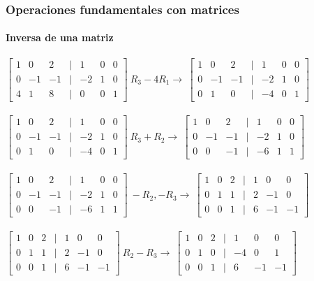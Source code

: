 \documentclass[11pt]{beamer}
\begin{document}
\begin{frame}
\frametitle{Operaciones fundamentales con matrices}
\framesubtitle{Inversa de una matriz}
${\displaystyle {\begin{bmatrix}1&0&2&|&1&0&0\\0&-1&-1&|&-2&1&0\\4&1&8&|&0&0&1\end{bmatrix}}} 
~ R_3 -4R_1 \rightarrow ~ {\displaystyle {\begin{bmatrix}1&0&2&|&1&0&0\\0&-1&-1&|&-2&1&0\\0&1&0&|&-4&0&1\end{bmatrix}}}$\\ \hspace{0cm} \\
${\displaystyle {\begin{bmatrix}1&0&2&|&1&0&0\\0&-1&-1&|&-2&1&0\\0&1&0&|&-4&0&1\end{bmatrix}}} 
~ R_3 +R_2 \rightarrow ~ {\displaystyle {\begin{bmatrix}1&0&2&|&1&0&0\\0&-1&-1&|&-2&1&0\\0&0&-1&|&-6&1&1\end{bmatrix}}}$\\ \hspace{0cm} \\
${\displaystyle {\begin{bmatrix}1&0&2&|&1&0&0\\0&-1&-1&|&-2&1&0\\0&0&-1&|&-6&1&1\end{bmatrix}}} 
~ -R_2, -R_3 \rightarrow ~ {\displaystyle {\begin{bmatrix}1&0&2&|&1&0&0\\0&1&1&|&2&-1&0\\0&0&1&|&6&-1&-1\end{bmatrix}}}$\\ \hspace{0cm} \\
${\displaystyle {\begin{bmatrix}1&0&2&|&1&0&0\\0&1&1&|&2&-1&0\\0&0&1&|&6&-1&-1\end{bmatrix}}} 
~ R_2-R_3 \rightarrow ~ {\displaystyle {\begin{bmatrix}1&0&2&|&1&0&0\\0&1&0&|&-4&0&1\\0&0&1&|&6&-1&-1\end{bmatrix}}}$\\ \hspace{0cm} \\
\end{frame}
\end{document}
